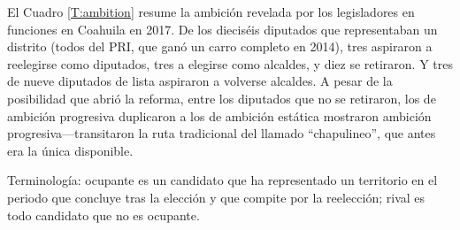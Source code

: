 \documentclass[letter,12pt]{article}
\begin{document}
El Cuadro \ref{T:ambition} resume la ambición revelada por los legisladores en funciones en Coahuila en 2017. De los dieciséis diputados que representaban un distrito (todos del PRI, que ganó un carro completo en 2014), tres aspiraron a reelegirse como diputados, tres a elegirse como alcaldes, y diez se retiraron. Y tres de nueve diputados de lista aspiraron a volverse alcaldes. A pesar de la posibilidad que abrió la reforma, entre los diputados que no se retiraron, los de ambición progresiva duplicaron a los de ambición estática mostraron ambición progresiva---transitaron la ruta tradicional del llamado ``chapulineo'', que antes era la única disponible.

Terminología: ocupante es un candidato que ha representado un territorio en el periodo que concluye tras la elección y que compite por la reelección; rival es todo candidato que no es ocupante.  







\end{document}
